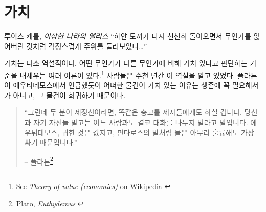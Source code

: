 \chapter{가치}
\label{les:10}

\begin{chapquote}{루이스 캐롤, \textit{이상한 나라의 앨리스}}
\enquote{하얀 토끼가 다시 천천히 돌아오면서 무언가를 잃어버린 것처럼 걱정스럽게 주위를 둘러보았다\ldots}
\end{chapquote}

\begin{comment}
Value is somewhat paradoxical, and there are multiple theories\footnote{See
\textit{Theory of value (economics)} on Wikipedia \cite{wiki:theory-of-value}}
which try to explain why we value certain things over other things. People have
been aware of this paradox for thousands of years. As Plato wrote in his
dialogue with Euthydemus, we value some things because they are rare, and not
merely based on their necessity for our survival.
\end{comment}
가치는 다소 역설적이다. 
어떤 무언가가 다른 무언가에 비해 가치 있다고 판단하는 기준을 내세우는 여러 이론이 있다.\footnote{See
\textit{Theory of value (economics)} on Wikipedia \cite{wiki:theory-of-value}}
사람들은 수천 년간 이 역설을 알고 있었다. 
플라톤이 에우티데모스에서 언급했듯이 어떠한 물건이 가치 있는 이유는 생존에 꼭 필요해서가 아니고,
그 물건이 희귀하기 때문이다.

\begin{quotation}\begin{samepage}
\enquote{그런데 두 분이 제정신이라면, 똑같은 충고를 제자들에게도 하실 겁니다.
	당신과 자기 자신들 말고는 어느 사람과도 결코 대화를 나누지 말라고 말입니다.
	에우튀데모스, 귀한 것은 값지고, 핀다로스의 말처럼 물은 아무리 훌륭해도 가장 싸기 때문입니다.}
\begin{flushright} -- 플라톤\footnote{Plato, \textit{Euthydemus} \cite{euthydemus}}
\end{flushright}\end{samepage}\end{quotation}

